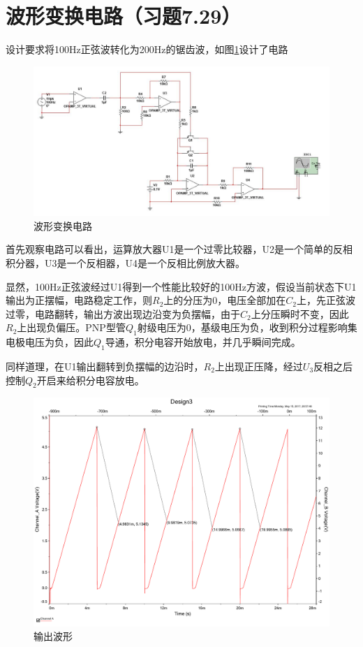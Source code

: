 \documentclass[UTF8,a4paper]{paper}
\begin{document}
\section{波形变换电路（习题7.29）}
设计要求将100Hz正弦波转化为200Hz的锯齿波，如图\ref{cir3}设计了电路
\begin{figure}[h]
\centering
\includegraphics[width=\columnwidth]{cir3.jpg}
\caption{波形变换电路}
\label{cir3}
\end{figure}
首先观察电路可以看出，运算放大器U1是一个过零比较器，U2是一个简单的反相积分器，U3是一个反相器，U4是一个反相比例放大器。

显然，100Hz正弦波经过U1得到一个性能比较好的100Hz方波，假设当前状态下U1输出为正摆幅，电路稳定工作，则$R_2$上的分压为0，电压全部加在$C_2$上，先正弦波过零，电路翻转，输出方波出现边沿变为负摆幅，由于$C_2$上分压瞬时不变，因此$R_2$上出现负偏压。PNP型管$Q_1$射级电压为0，基级电压为负，收到积分过程影响集电极电压为负，因此$Q_1$导通，积分电容开始放电，并几乎瞬间完成。

同样道理，在U1输出翻转到负摆幅的边沿时，$R_2$上出现正压降，经过$U_3$反相之后控制$Q_2$开启来给积分电容放电。

\begin{figure}[H]
\centering
\includegraphics[width=\columnwidth]{wave3.pdf}
\caption{输出波形}
\label{wave3}
\end{figure}
\end{document}
